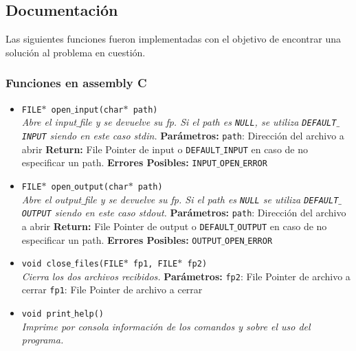 \documentclass[a4paper, 10pt]{article}
\def\code#1{\texttt{#1}}
\begin{document}
		\subsection{Documentación}
			Las siguientes funciones fueron implementadas con el objetivo de encontrar una solución al problema
			en cuestión.

			\subsubsection{Funciones en assembly C}	
			\begin{itemize}

				\item \code{FILE$*$ open$\_$input(char$*$ path)}
				\\\textit{Abre el input$\_$file y se devuelve su fp.
				Si el path es \code{NULL},
				se utiliza \code{DEFAULT$\_$INPUT} siendo en este caso stdin.}
					\subitem \textbf{Parámetros:}
						\subsubitem \code{path}: Dirección del archivo a abrir
					\subitem \textbf{Return:}
						\subsubitem File Pointer de input o \code{DEFAULT$\_$INPUT}
						en caso de no especificar un path.
					\subitem \textbf{Errores Posibles:}
						\subsubitem \code{INPUT$\_$OPEN$\_$ERROR}

				\item \code{FILE$*$ open$\_$output(char$*$ path)}
				\\\textit{Abre el output$\_$file y se devuelve su fp. Si el path es \code{NULL}
				se utiliza \code{DEFAULT$\_$OUTPUT} siendo en este caso stdout.}
					\subitem \textbf{Parámetros:}
						\subsubitem \code{path}: Dirección del archivo a abrir
					\subitem \textbf{Return:}
						\subsubitem File Pointer de output o \code{DEFAULT$\_$OUTPUT} en caso de
						no especificar un path.
					\subitem \textbf{Errores Posibles:}
						\subsubitem \code{OUTPUT$\_$OPEN$\_$ERROR}

				\item \code{void close$\_$files(FILE$*$ fp1, FILE$*$ fp2)}
				\\\textit{Cierra los dos archivos recibidos.}
					\subitem \textbf{Parámetros:}
						\subsubitem \code{fp2}: File Pointer de archivo a cerrar
						\subsubitem \code{fp1}: File Pointer de archivo a cerrar

				\item \code{void print$\_$help()}
				\\\textit{Imprime por consola información de los comandos y sobre el
				uso del programa.}


\end{itemize}
\end{document}
